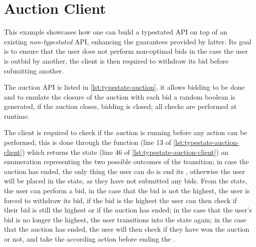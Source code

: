 \section{Auction Client}


This example showcases how one can build a typestated API on top of an existing \emph{non-typestated} API,
enhancing the guarantees provided by latter.
Its goal is to ensure that the user does not perform non-optimal bids 
in the case the user is outbid by another, the client is then required to withdraw its bid before submitting another.

The auction API is listed in \autoref{lst:typestate-auction},
it allows bidding to be done and to emulate the closure of the auction with each bid a random boolean is generated,
if the auction closes, bidding is closed; all checks are performed at runtime.

The client is required to check if the auction is running before any action can be performed,
this is done through the  function (line 13 of \autoref{lst:typestate-auction-client})
which returns the  state (line 46 of \autoref{lst:typestate-auction-client})
an enumeration representing the two possible outcomes of the transition;
in case the auction has ended, the only thing the user can do is end its ,
otherwise the user will be placed in the  state, as they have not submitted any bids.
From the  state, the user can perform a bid,
in the case that the bid is not the highest, the user is forced to withdraw its bid,
if the bid is the highest the user can then check if their bid is still the highest or if the auction has ended;
in the case that the user's bid is no longer the highest, the user transitions into the  state again;
in the case that the auction has ended, the user will then check if they have won the auction or not,
and take the according action before ending the .


